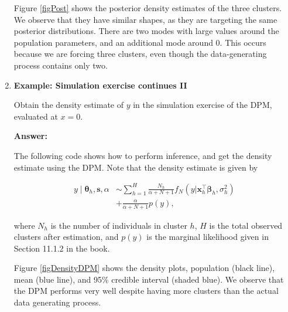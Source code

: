 \begin{enumerate}[leftmargin=*]
Figure \ref{figPost} shows the posterior density estimates of the three clusters. We observe that they have similar shapes, as they are targeting the same posterior distributions. There are two modes with large values around the population parameters, and an additional mode around 0. This occurs because we are forcing three clusters, even though the data-generating process contains only two.

	\item \textbf{Example: Simulation exercise continues II}

Obtain the density estimate of $y$ in the simulation exercise of the DPM, evaluated at $x=0$.

\textbf{Answer:}

The following code shows how to perform inference, and get the density estimate using the DPM. Note that the density estimate is given by 

\begin{align*}
	y\mid \boldsymbol\theta_h, \boldsymbol{s}, \alpha & \sim \sum_{h=1}^H\frac{N_h}{\alpha+N+1}f_N(y|\boldsymbol{x}_h^{\top}\boldsymbol{\beta}_h,\sigma_h^2)\\
	& +\frac{\alpha}{\alpha+N+1}p(y),
\end{align*}

where $N_h$ is the number of individuals in cluster $h$, $H$ is the total observed clusters after estimation, and $p(y)$ is the marginal likelihood given in Section 11.1.2 in the book.

Figure \ref{figDensityDPM} shows the density plots, population (black line), mean (blue line), and 95\% credible interval (shaded blue). We observe that the DPM performs very well despite having more clusters than the actual data generating process.  


\end{enumerate}
